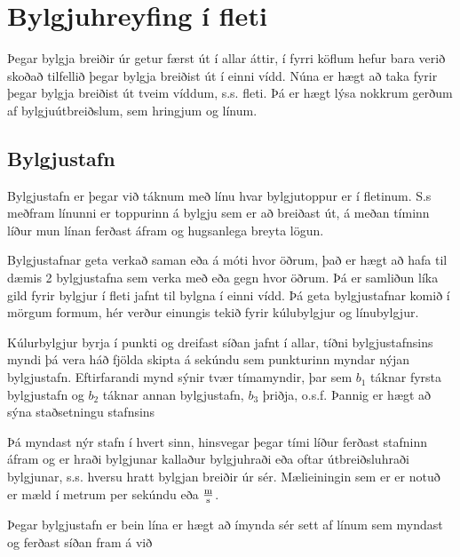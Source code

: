 \chapter{Bylgjuhreyfing í fleti}
Þegar bylgja breiðir úr getur færst út í allar áttir, í fyrri köflum
hefur bara verið skoðað tilfellið þegar bylgja breiðist út
í einni vídd. Núna er hægt að taka fyrir þegar bylgja breiðist
út tveim víddum, s.s. fleti. Þá er hægt lýsa nokkrum gerðum af
bylgjuútbreiðslum, sem hringjum og línum.

\section{Bylgjustafn}
Bylgjustafn er þegar við táknum með línu hvar bylgjutoppur er
í fletinum. S.s meðfram línunni er toppurinn á bylgju sem er að breiðast
út, á meðan tíminn líður mun línan ferðast áfram og hugsanlega breyta
lögun.

Bylgjustafnar geta verkað saman eða á móti hvor öðrum, það er hægt að
hafa til dæmis 2 bylgjustafna sem verka með eða gegn hvor öðrum. Þá
er samliðun líka gild fyrir bylgjur í fleti jafnt til bylgna í einni
vídd. Þá geta bylgjustafnar komið í mörgum formum, hér verður einungis
tekið fyrir kúlubylgjur og línubylgjur.

Kúlurbylgjur byrja í punkti og dreifast síðan jafnt í allar, tíðni
bylgjustafnsins myndi þá vera háð fjölda skipta á sekúndu sem
punkturinn myndar nýjan bylgjustafn. Eftirfarandi mynd sýnir
tvær tímamyndir, þar sem $b_1$ táknar fyrsta bylgjustafn og
$b_2$ táknar annan bylgjustafn, $b_3$ þriðja, o.s.f. Þannig
er hægt að sýna staðsetningu stafnsins
\begin{center}
\end{center} 

Þá myndast nýr stafn í hvert sinn, hinsvegar þegar tími líður ferðast
stafninn áfram og er hraði bylgjunar kallaður bylgjuhraði eða
oftar útbreiðsluhraði bylgjunar, s.s. hversu hratt bylgjan breiðir
úr sér. Mælieiningin sem er er notuð er mæld í metrum per sekúndu eða
$\frac{\textrm{m}}{\textrm{s}}$.

Þegar bylgjustafn er bein lína er hægt að ímynda sér sett af línum
sem myndast og ferðast síðan fram á við
\begin{center}
\end{center}

